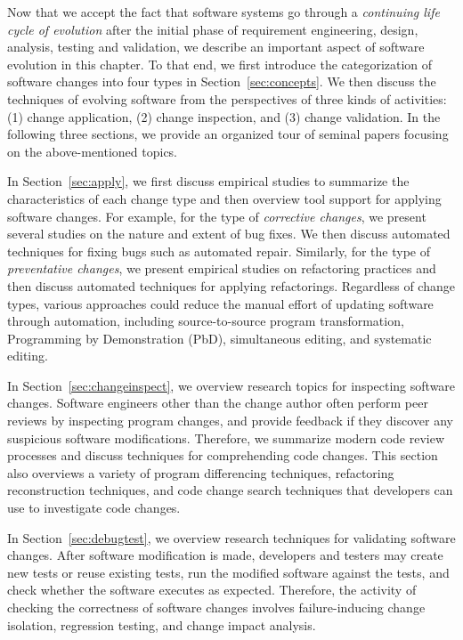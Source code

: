 Now that we accept the fact that software systems go through a {\em continuing life cycle of evolution} after the initial phase of requirement engineering, design, analysis, testing and validation, we describe an important aspect of software evolution in this chapter. To that end, we first introduce the categorization of software changes into four types in Section~\ref{sec:concepts}. We then discuss the techniques of evolving software from the perspectives of three kinds of activities: (1) change application, (2) change inspection, and (3) change validation. In the following three sections, we provide an organized tour of seminal papers focusing on the above-mentioned topics. 

In Section~\ref{sec:apply}, we first discuss empirical studies to summarize the characteristics of each change type and then overview tool support for applying software changes. For example, for the type of {\em corrective changes}, we present several studies on the nature and extent of bug fixes. We then discuss automated techniques for fixing bugs such as automated repair. Similarly, for the type of {\em preventative changes}, we present empirical studies on refactoring practices and then discuss automated techniques for applying refactorings.  Regardless of change types, various approaches could reduce the manual effort of updating software through automation, including source-to-source program transformation, Programming by Demonstration (PbD), simultaneous editing, and systematic editing.

In Section~\ref{sec:changeinspect}, we overview research topics for inspecting software changes. Software engineers other than the change author often perform peer reviews by inspecting program changes, and provide feedback if they discover any suspicious software modifications. Therefore, we summarize modern code review processes and discuss techniques for comprehending code changes. This section also overviews a variety of program differencing techniques, refactoring reconstruction techniques, and code change search techniques that developers can use to investigate code changes. 

In Section~\ref{sec:debugtest}, we overview research techniques for validating software changes. After software modification is made, developers and testers may create new tests or reuse existing tests, run the modified software against the tests, and check whether the software executes as expected. Therefore, the activity of checking the correctness of software changes involves failure-inducing change isolation, regression testing, and change impact analysis. 
